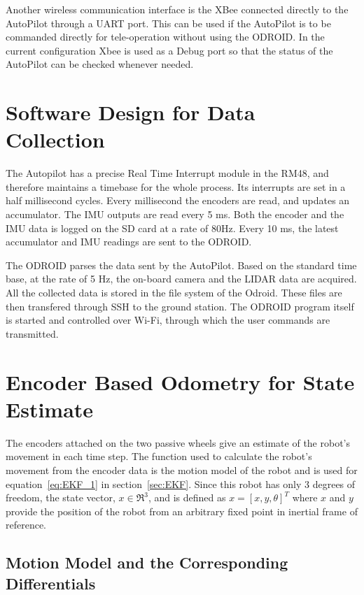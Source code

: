 Another wireless communication interface is the XBee connected directly to the AutoPilot through a UART port. This can be used if the AutoPilot is to be commanded directly for tele-operation without using the ODROID. In the current configuration Xbee is used as a Debug port so that the status of the AutoPilot can be checked whenever needed. 

\section{Software Design for Data Collection}
The Autopilot has a precise Real Time Interrupt module in the RM48, and therefore maintains a timebase for the whole process. Its interrupts are set in a half millisecond cycles. Every millisecond the encoders are read, and updates an accumulator. The IMU outputs are read every 5 ms. Both the encoder and the IMU data is logged on the SD card at a rate of 80Hz. Every 10 ms, the latest accumulator and IMU readings are sent to the ODROID. 

The ODROID parses the data sent by the AutoPilot. Based on the standard time base, at the rate of 5 Hz, the on-board camera and the LIDAR data are acquired. All the collected data is stored in the file system of the Odroid. These files are then transfered through SSH to the ground station. The ODROID program itself is started and controlled over Wi-Fi, through which the user commands are transmitted. 

\section{Encoder Based Odometry for State Estimate}

The encoders attached on the two passive wheels give an estimate of the robot's movement in each time step. The function used to calculate the robot's movement from the encoder data is the motion model of the robot and is used for equation~\ref{eq:EKF_1} in section~\ref{sec:EKF}. Since this robot has only 3 degrees of freedom, the state vector, $ x \in \Re^3 $, and is defined as $ x = [x,y,\theta]^T $ where $ x $ and $ y $ provide the position of the robot from an arbitrary fixed point in inertial frame of reference. 

\subsection{Motion Model and the Corresponding Differentials}

